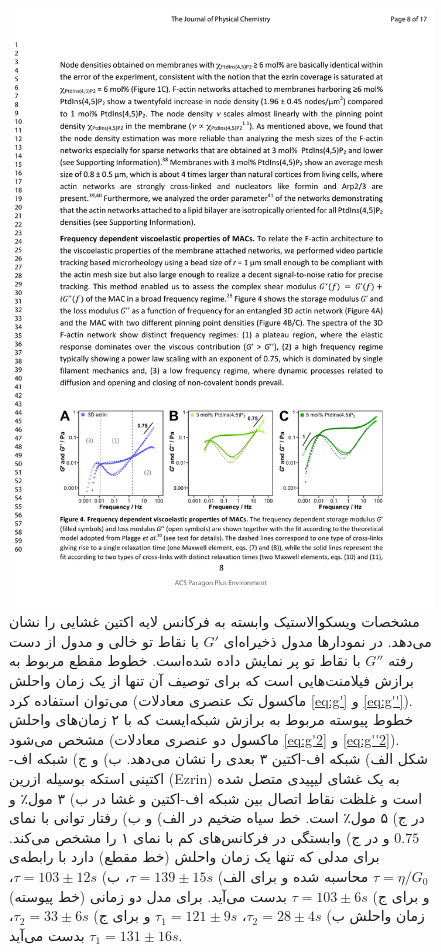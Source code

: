 \begin{figure}[htbp]
\begin{center}
\includegraphics[width=6.5in]{Figs/GGprime}
\caption{
مشخصات ویسکوالاستیک وابسته به فرکانس لایه اکتین غشایی را نشان می‌دهد. در نمودارها مدول ذخیرا‌ه‌ای $G'$ با نقاط تو خالی و مدول از دست رفته $G''$ با نقاط تو پر نمایش داده شده‌است. خطوط مقطع  مربوط به برازش فیلامنت‌هایی است که برای توصیف آن تنها از یک زمان واحلش می‌توان استفاده کرد (ماکسول تک عنصری معادلات \ref{eq:g'} و \ref{eq:g''}). خطوط پیوسته مربوط به برازش شبکه‌ایست که با ۲ زمان‌های واحلش مشخص می‌شود (ماکسول دو عنصری معادلات \ref{eq:g'2} و \ref{eq:g''2}). شکل الف) شبکه اف-اکتین ۳ بعدی را نشان می‌دهد. ب) و ج) شبکه اف-اکتینی استکه بوسیله ازرین (Ezrin) به یک غشای لیپیدی متصل شده است و غلظت نقاط اتصال بین شبکه اف-اکتین و غشا در ب) ۳ مول٪ و در ج) ۵ مول٪ است.  خط سیاه ضخیم در الف) و ب) رفتار توانی با نمای $0.75$  و در ج) وابستگی در فرکانس‌های کم با نمای ۱ را مشخص می‌کند. برای مدلی که تنها یک  زمان واحلش (خط مقطع) دارد با رابطه‌ی $\tau=\eta/G_0$ محاسبه شده و برای الف) $\tau=139\pm15 s$، ب) $\tau=103\pm12 s$، و برای ج) $\tau=103\pm6 s$ بدست می‌آید. برای مدل دو زمانی (خط پیوسته) زمان واحلش ب) $\tau_2=28\pm4 s$، $\tau_1=121\pm9 s$ و برای ج) $\tau_2=33\pm6 s$، $\tau_1=131\pm16 s$ بدست می‌آید\cite{doi:10.1021/acs.jpcb.7b11491}.
}
\label{fig:gg}
\end{center}
\end{figure}


